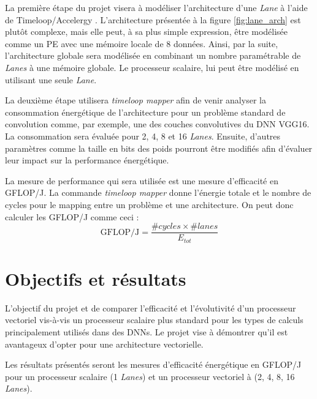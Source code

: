 \documentclass[11pt,letterpaper]{article}
\begin{document}
    La première étape du projet visera à modéliser l'architecture d'une \textit{Lane} à
    l'aide de Timeloop/Accelergy \cite{timeloop}. %
    L'architecture présentée à la figure \ref{fig:lane_arch}
    est plutôt complexe, mais elle peut, à sa plus simple expression, être modélisée comme
    un PE avec une mémoire locale de 8 données. Ainsi, par la suite, l'architecture globale
    sera modélisée en combinant un nombre paramétrable de \textit{Lanes} à une mémoire globale.
    Le processeur scalaire, lui peut être modélisé en utilisant une seule \textit{Lane}.

    La deuxième étape utilisera \textit{timeloop mapper} afin de venir analyser la consommation
    énergétique de l'architecture pour un problème standard de convolution comme, par exemple,
    une des couches convolutives du DNN VGG16. La consommation sera évaluée pour 2, 4, 8 et 16 
    \textit{Lanes}. Ensuite, d'autres paramètres comme la taille en bits des poids pourront
    être modifiés afin d'évaluer leur impact sur la performance énergétique.

    La mesure de performance qui sera utilisée est une mesure d'efficacité en GFLOP/J. La commande
    \textit{timeloop mapper} donne l'énergie totale et le nombre de cycles pour le mapping entre un problème et une architecture.
    On peut donc calculer les GFLOP/J comme ceci :
    $$\text{GFLOP/J} = \frac{\#cycles \times \#lanes}{E_{tot}}$$

\section*{Objectifs et résultats}
    L'objectif du projet et de comparer l'efficacité et l'évolutivité d'un processeur 
    vectoriel vis-à-vis un processeur scalaire plus standard pour les types de calculs
    principalement utilisés dans des DNNs. Le projet vise à démontrer qu'il est avantageux
    d'opter pour une architecture vectorielle.

    Les résultats présentés seront les mesures d'efficacité énergétique en GFLOP/J pour
    un processeur scalaire (1 \textit{Lanes}) et un processeur vectoriel à (2, 4, 8, 16 \textit{Lanes}).

{}
    
\end{document}
